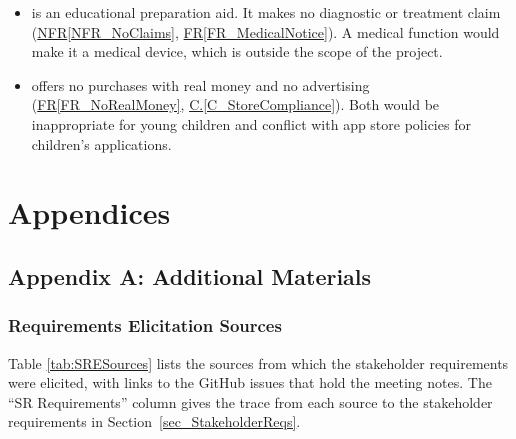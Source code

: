 \documentclass[12pt]{article}
\newcommand{\conref}[1]{\hyperref[#1]{C.\ref*{#1}}}
\newcommand{\rref}[1]{\hyperref[#1]{FR\ref*{#1}}}
\newcommand{\nfrref}[1]{\hyperref[#1]{NFR\ref*{#1}}}
\newcounter{lcnum} %
\newcounter{ulcnum} %
\begin{document}
\begin{itemize}
\item[\refstepcounter{ulcnum}\textbf{ULC\theulcnum}\label{ULC_NoClaims}:]
\progname{} is an educational preparation aid. It makes no diagnostic or
treatment claim (\nfrref{NFR_NoClaims}, \rref{FR_MedicalNotice}). A medical
function would make it a medical device, which is outside the scope of the
project.

\item[\refstepcounter{ulcnum}\textbf{ULC\theulcnum}\label{ULC_NoRealMoney}:]
\progname{} offers no purchases with real money and no advertising
(\rref{FR_NoRealMoney}, \conref{C_StoreCompliance}). Both would be
inappropriate for young children and conflict with app store policies for
children's applications.

\end{itemize}

\newpage{}

\section{Appendices}

\subsection{Appendix A: Additional Materials}

\subsubsection{Requirements Elicitation Sources} \label{sec_RESources}

Table \ref{tab:SRESources} lists the sources from which the stakeholder 
requirements were elicited, with links to the GitHub issues that hold the meeting 
notes. The “SR Requirements” column gives the trace from each source to the 
stakeholder requirements in Section~\ref{sec_StakeholderReqs}.
\end{document}
